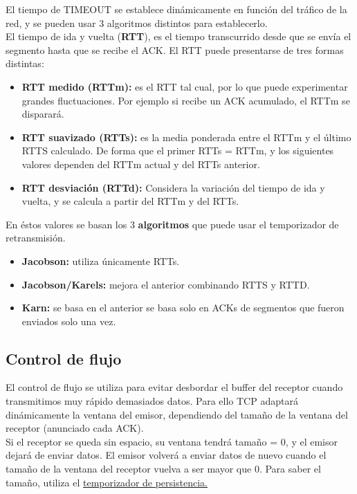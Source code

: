 \begin{tcolorbox}[
title=Temporizador de retransmisión (TIMEOUT),
colback=cyan!5!white,
colframe=cyan!75!black,
fonttitle=\bfseries]
El tiempo de TIMEOUT se establece dinámicamente en función del tráfico de la red, y se pueden usar 3 algoritmos distintos para establecerlo.\\

El tiempo de ida y vuelta (\textbf{RTT}), es el tiempo transcurrido desde que se envía el
segmento hasta que se recibe el ACK. El RTT puede presentarse de tres formas distintas:
\begin{itemize}
    \item \textbf{RTT medido (RTTm): }es el RTT tal cual, por lo que puede experimentar grandes fluctuaciones. Por ejemplo si recibe un ACK acumulado, el RTTm se disparará.
    \item \textbf{RTT suavizado (RTTs): }es la media ponderada entre el RTTm y el último RTTS calculado. De forma que el primer RTTs = RTTm, y los siguientes valores dependen del RTTm actual y del RTTs anterior.
    \item \textbf{RTT desviación (RTTd): }Considera la variación del tiempo de ida y vuelta, y se calcula a partir del RTTm y del RTTs.
\end{itemize}

En éstos valores se basan los 3 \textbf{algoritmos} que puede usar el temporizador de retransmisión.
\begin{itemize}
    \item \textbf{Jacobson: }utiliza únicamente RTTs.
    \item \textbf{Jacobson/Karels: }mejora el anterior combinando RTTS y RTTD.
    \item \textbf{Karn: }se basa en el anterior se basa solo en ACKs de segmentos que fueron enviados solo una vez.
\end{itemize}
\end{tcolorbox}
\subsection{Control de flujo}
El control de flujo se utiliza para evitar desbordar el buffer del receptor cuando transmitimos muy rápido demasiados datos. Para ello TCP adaptará dinámicamente la ventana del emisor, dependiendo del tamaño de la ventana del receptor (anunciado cada ACK).\\

Si el receptor se queda sin espacio, su ventana tendrá tamaño = 0, y el emisor dejará de enviar datos. El emisor volverá a enviar datos de nuevo cuando el tamaño de la ventana del receptor vuelva a ser mayor que 0. Para saber el tamaño, utiliza el \underline{\hyperref[tempers]{temporizador de persistencia.}}

